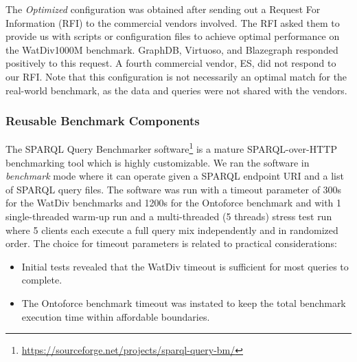 The \emph{Optimized} configuration was obtained after sending out a  Request For Information (RFI) to the commercial vendors involved. The RFI asked them to provide us with scripts or configuration files to achieve optimal performance on the WatDiv1000M benchmark. GraphDB, Virtuoso, and Blazegraph responded positively to this request. A fourth commercial vendor, ES, did not respond to our RFI. Note that this configuration is not necessarily an optimal match for the real-world benchmark, as the data and queries were not shared with the vendors.

\begin{table}[ht!]
	\centering
	\caption{Different configuration choices defined in this benchmark}
	\label{table:configs}
\end{table}

\subsubsection{Reusable Benchmark Components}
The SPARQL Query Benchmarker software\footnote{\scriptsize \url{https://sourceforge.net/projects/sparql-query-bm/}} is a mature SPARQL-over-HTTP benchmarking tool which is highly customizable. We ran the software in \emph{benchmark} mode where it can operate given a SPARQL endpoint URI and a list of SPARQL query files. The software was run with a timeout parameter of 300s for the WatDiv benchmarks and 1200s for the Ontoforce benchmark and with 1 single-threaded warm-up run and a multi-threaded (5 threads) stress test run where 5 clients each execute a full query mix independently and in randomized order. 
The choice for timeout parameters is related to practical considerations: 
\begin{itemize}
	\item Initial tests revealed that the WatDiv timeout is sufficient for most queries to complete.
	\item The Ontoforce benchmark timeout was instated to keep the total benchmark execution time within affordable boundaries.
\end{itemize} 

